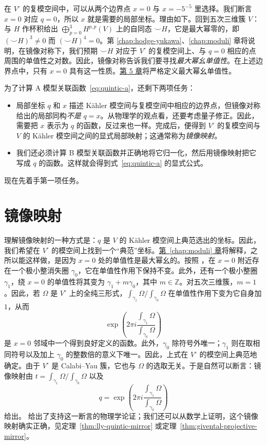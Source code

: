 在 $V^\circ$ 的复模空间中，可以从两个边界点 $x=0$ 与 $x=-5^{-5}$ 里选择。我们断言 $x=0$ 对应 $q=0$，所以 $x$ 就是需要的局部坐标。理由如下。回到五次三维簇 $V$：与 $H$ 作杯积给出 $\bigoplus_{p=0}^3H^{p,p}(V)$ 上的自同态 $\smile H$，它是最大幂零的，即 $(\smile H)^3\ne0$ 而 $(\smile H)^4=0$。第 \hyperref[chap:hodge-yukawa]{\ref*{chap:hodge-yukawa}}、\hyperref[chap:moduli]{\ref*{chap:moduli}} 章将说明，在镜像对称下，我们预期 $\smile H$ 对应于 $V^\circ$ 的复模空间上、与 $q=0$ 相应的点周围的单值性之对数。因此，镜像对称告诉我们要寻找\emph{最大幂幺单值性}。在上述边界点中，只有 $x=0$ 具有这一性质。\hyperref[chap:hodge-yukawa]{第 5 章}将严格定义最大幂幺单值性。

为了计算 A 模型关联函数~\eqref{eq:quintic-a}，还剩下两项任务：
\begin{itemize}
\item 局部坐标 $q$ 和 $x$ 描述 Kähler 模空间与复模空间中相应的边界点，但镜像对称给出的局部同构\emph{不是} $q=x$。从物理学的观点看，还要考虑量子修正。因此，需要把 $x$ 表示为 $q$ 的函数，反过来也一样。完成后，便得到 $V^\circ$ 的复模空间与 $V$ 的 Kähler 模空间之间的显式局部映射；这通常称为\emph{镜像映射}。

\item 我们还必须计算 B 模型关联函数并正确地将它归一化，然后用镜像映射把它写成 $q$ 的函数。这样就会得到式~\eqref{eq:quintic-a} 的显式公式。
\end{itemize}
现在先着手第一项任务。

\section{镜像映射}\label{sec:quintic-mirror-map}

理解镜像映射的一种方式是：$q$ 是 $V$ 的 Kähler 模空间上典范选出的坐标。因此，我们希望在 $V^\circ$ 的模空间上找到一个“典范”坐标。\hyperref[chap:moduli]{第~\ref*{chap:moduli} 章}将解释，之所以能这样做，是因为 $x=0$ 处的单值性是最大幂幺的。按照 ，在 $x=0$ 附近存在一个极小整消失圈 $\gamma_0$，它在单值性作用下保持不变。此外，还有一个极小整圈 $\gamma_1$，绕 $x=0$ 的单值性将其变为 $\gamma_1+m\gamma_0$，其中 $m\in\mathbb Z$。对五次三维簇，$m=1$ 。因此，若 $\Omega$ 是 $V^\circ$ 上的全纯三形式，$\int_{\gamma_1}\Omega/\int_{\gamma_0}\Omega$ 在单值性作用下变为它自身加 $1$，从而
\[
\exp\!\left(2\pi i\frac{\int_{\gamma_1}\Omega}{\int_{\gamma_0}\Omega}\right)
\]
是 $x=0$ 邻域中一个得到良好定义的函数。此外，$\gamma_0$ 除符号外唯一；$\gamma_1$ 则在取相同符号以及加上 $\gamma_0$ 的整数倍的意义下唯一。因此，上式在 $V^\circ$ 的模空间上典范地确定。由于 $V^\circ$ 是 Calabi--Yau 簇，它也与 $\Omega$ 的选取无关。于是自然可以断言：镜像映射由 $t=\int_{\gamma_1}\Omega/\int_{\gamma_0}\Omega$ 以及
\begin{equation}\label{eq:mirror-map-periods}
q=\exp\!\left(2\pi i\frac{\int_{\gamma_1}\Omega}{\int_{\gamma_0}\Omega}\right)
\end{equation}
给出。 给出了支持这一断言的物理学论证；我们还可以从数学上证明，这个镜像映射确实正确，见定理~\ref{thm:lly-quintic-mirror} 或定理~\ref{thm:givental-projective-mirror}。

